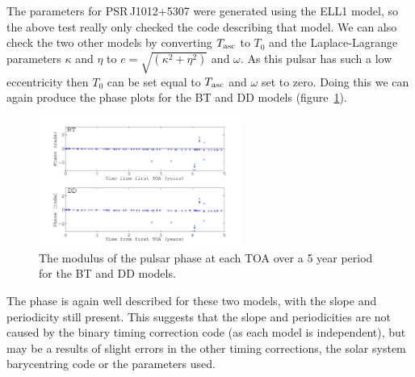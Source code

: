 The parameters for PSR\,J1012+5307 were generated using the ELL1 model, so the above test really
only checked the code describing that model. We can also check the two other models by converting
$T_{\rm{asc}}$ to $T_0$ and the Laplace-Lagrange parameters $\kappa$ and $\eta$ to $e =
\sqrt{(\kappa^2+\eta^2)}$ and $\omega$. As this pulsar has such a low eccentricity then $T_0$ can be
set equal to $T_{\rm{asc}}$ and $\omega$ set to zero. Doing this we can again produce the phase
plots for the BT and DD models (figure~\ref{J1012+5307BT_DDPhase}).
\begin{figure}[!htbp]
\begin{center}
\includegraphics[width=0.6\textwidth]{figs/J1012+5307BT_DDPhase}
\caption{The modulus of the pulsar phase at each TOA over a 5 year period for the BT
and DD models.}\label{J1012+5307BT_DDPhase}
\end{center}
\end{figure}
The phase is again well described for these two models, with the slope and periodicity still
present. This suggests that the slope and periodicities are not caused by the binary timing
correction code (as each model is independent), but may be a results of slight errors in the other
timing corrections, the solar system barycentring code or the parameters used.

